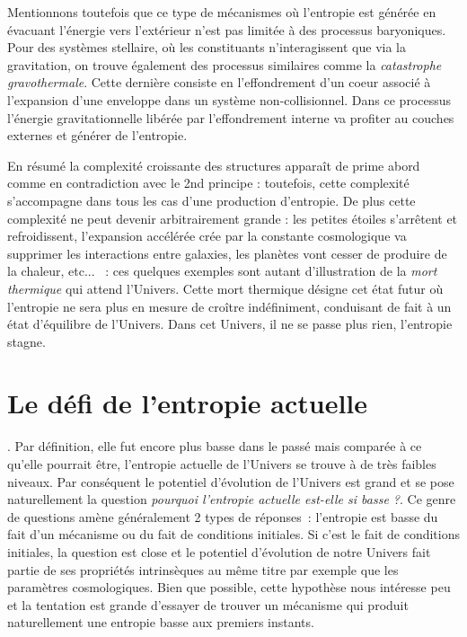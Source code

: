 Mentionnons toutefois que ce type de mécanismes où l'entropie est générée en évacuant l'énergie vers l'extérieur n'est pas limitée à des processus baryoniques. Pour des systèmes stellaire, où les constituants n'interagissent que via la gravitation, on trouve également des processus similaires comme la \textit{catastrophe gravothermale}. Cette dernière consiste en l'effondrement d'un coeur associé à l'expansion d'une enveloppe dans un système non-collisionnel. Dans ce processus l'énergie gravitationnelle libérée par l'effondrement interne va profiter au couches externes et générer de l'entropie.

En résumé la complexité croissante des structures apparaît de prime abord comme en contradiction avec le 2nd principe : toutefois, cette complexité s'accompagne dans tous les cas d'une production d'entropie. De plus cette complexité ne peut devenir arbitrairement grande : les petites étoiles s'arrêtent et refroidissent, l'expansion accélérée crée par la constante cosmologique va supprimer les interactions entre galaxies, les planètes vont cesser de produire de la chaleur, etc... ~: ces quelques exemples sont autant d'illustration de la \textit{mort thermique} qui attend l'Univers. Cette mort thermique désigne cet état futur où l'entropie ne sera plus en mesure de croître indéfiniment, conduisant de fait à un état d'équilibre de l'Univers. Dans cet Univers, il ne se passe plus rien, l'entropie stagne.

\section{Le défi de l'entropie actuelle}

. Par définition, elle fut encore plus basse dans le passé mais comparée à ce qu'elle pourrait être, l'entropie actuelle de l'Univers se trouve à de très faibles niveaux. Par conséquent le potentiel d'évolution de l'Univers est grand et se pose naturellement la question \textit{pourquoi l'entropie actuelle est-elle si basse ?}. Ce genre de questions amène généralement 2 types de réponses~: l'entropie est basse du fait d'un mécanisme ou du fait de conditions initiales. Si c'est le fait de conditions initiales, la question est close et le potentiel d'évolution de notre Univers fait partie de ses propriétés intrinsèques au même titre par exemple que les paramètres cosmologiques. Bien que possible, cette hypothèse nous intéresse peu et la tentation est grande d'essayer de trouver un mécanisme qui produit naturellement une entropie basse aux premiers instants.

